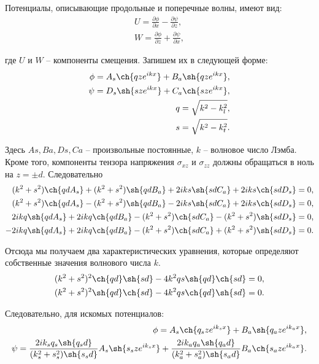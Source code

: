 Потенциалы, описывающие продольные и поперечные волны, имеют вид:
\begin{eqnarray}
U = \frac{\partial \phi}{\partial x} - \frac{\partial \psi}{\partial z}, \nonumber\\
W = \frac{\partial \phi}{\partial z} + \frac{\partial \psi}{\partial x},
\end{eqnarray}

где $U$ и $W$ -- компоненты смещения. Запишем их в следующей форме:
\begin{eqnarray}
\phi = A_s \ch{qze^{ikx}} + B_a \sh{qze^{ikx}}, \nonumber\\
\psi = D_s \sh{sze^{ikx}} + C_a \ch{sze^{ikx}}, \nonumber\\
q = \sqrt{k^2 - k_l^2}, \nonumber\\
s = \sqrt{k^2 - k_t^2}.
\end{eqnarray}

Здесь $As, Ba, Ds, Ca$ -- произвольные постоянные, $k$ -- волновое число Лэмба. Кроме того, компоненты тензора напряжения $\sigma_{xz}$ и $\sigma_{zz}$ должны обращаться в ноль на $z = \pm d$. Следовательно
\begin{eqnarray}
(k^2+s^2)\ch{qdA_s} + (k^2+s^2)\sh{qdB_a} + 2iks\sh{sdC_a} + 2iks\ch{sdD_s} = 0, \nonumber\\
(k^2+s^2)\ch{qdA_s} - (k^2+s^2)\sh{qdB_a} - 2iks\sh{sdC_a} + 2iks\ch{sdD_s} = 0, \nonumber\\
2ikq\sh{qdA_s} + 2ikq\ch{qdB_a} - (k^2+s^2)\ch{sdC_a} - (k^2+s^2)\sh{sdD_s} = 0, \nonumber\\
-2ikq\sh{qdA_s} + 2ikq\ch{qdB_a} - (k^2+s^2)\ch{sdC_a} + (k^2+s^2)\sh{sdD_s} = 0.
\end{eqnarray}

Отсюда мы получаем два характеристических уравнения, которые определяют собственные значения волнового числа $k$.
\begin{eqnarray}
(k^2+s^2)^2\ch{qd}\sh{sd} - 4k^2qs\sh{qd}\ch{sd} = 0, \nonumber\\
(k^2+s^2)^2\sh{qd}\ch{sd} - 4k^2qs\ch{qd}\sh{sd} = 0.
\end{eqnarray}

Следовательно, для искомых потенциалов:
\begin{eqnarray}
\phi = A_s\ch{q_{s}ze^{ik_{s}x}} + B_a\sh{q_{a}ze^{ik_{a}x}}, \nonumber\\
\psi = \frac{ 2ik_{s}q_{s}\sh{q_{s}d} }{ (k_s^2+s_s^2)\sh{s_{s}d} } A_s\sh{s_{s}ze^{ik_{s}x}} + \frac{ 2ik_{a}q_{a}\sh{q_{a}d} }{ (k_a^2+s_a^2)\sh{s_{a}d} } B_a\ch{s_{a}ze^{ik_{a}x}}.
\end{eqnarray}

